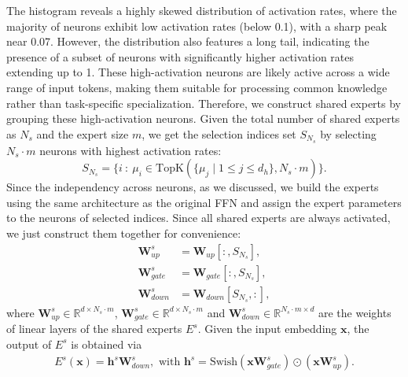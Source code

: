 The histogram reveals a highly skewed distribution of activation rates, where the majority of neurons exhibit low activation rates (below 0.1), with a sharp peak near 0.07.
However, the distribution also features a long tail, indicating the presence of a subset of neurons with significantly higher activation rates extending up to 1.
These high-activation neurons are likely active across a wide range of input tokens, making them suitable for processing common knowledge rather than task-specific specialization.
Therefore, we construct shared experts by grouping these high-activation neurons.
Given the total number of shared experts as $N_s$ and the expert size $m$, we get the selection indices set $S_{N_s}$ by selecting  $N_s\cdot m$ neurons with highest activation rates:
\begin{equation}
    S_{N_s} =\{ i\ :\ \mu_i \in \text{TopK}(\{ \mu_j \mid 1 \leq j \leq d_h \}, N_s\cdot m) \}.
\end{equation}
Since the independency across neurons, as we discussed, we build the experts using the same architecture as the original FFN and assign the expert parameters to the neurons of selected indices.
Since all shared experts are always activated, we just construct them together for convenience:
\begin{equation}
\begin{aligned}
\label{eq:expert_w}
    \mathbf{W}_{up}^{s} &= \mathbf{W}_{up}[:,S_{N_s}],  \\ 
    \mathbf{W}_{gate}^{s} &= \mathbf{W}_{gate}[:,S_{N_s}], \\
    \mathbf{W}_{down}^{s} &= \mathbf{W}_{down}[S_{N_s},:],
\end{aligned}
\end{equation}
where $\mathbf{W}_{up}^{s} \in \mathbb{R}^{d\times N_s \cdot m}$, $\mathbf{W}_{gate}^{s} \in \mathbb{R}^{d\times N_s \cdot m}$ and $\mathbf{W}_{down}^{s} \in \mathbb{R}^{N_s \cdot m \times d}$ are the weights of linear layers of the shared experts $E^{s}$.
Given the input embedding $\mathbf{x}$, the output of $E^s$ is obtained via
\begin{equation*}
\begin{aligned}
     E^{s}(\mathbf{x}) \!=\! \mathbf{h}^{s}\mathbf{W}_{down}^{s}, \mbox { with }
     \mathbf{h}^{s}   \!=\! \text{Swish} (\mathbf{x}\mathbf{W}_{gate}^{s}) \!\odot\! (\mathbf{x}\mathbf{W}_{up}^{s}).
\end{aligned}
\end{equation*}


